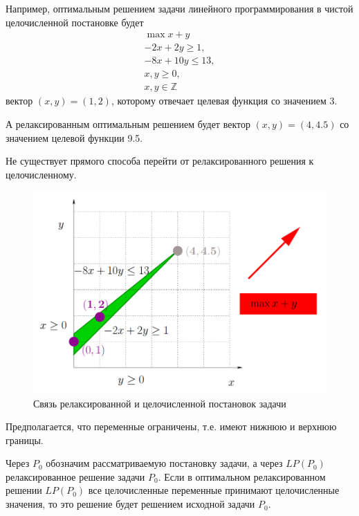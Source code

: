 \documentclass[%
	11pt,
	a4paper,
	utf8,
		]{article}
\begin{document}

Например, оптимальным решением задачи линейного программирования в чистой целочисленной постановке будет
\begin{align*}
	\max x + y\\
	-2x + 2 y \geqslant 1,\\
	-8 x + 10 y \leqslant 13,\\
	x,y \geqslant 0,\\
	x,y \in \mathbb{Z}
\end{align*}
вектор $ (x, y) = (1, 2) $, которому отвечает целевая функция со значением 3.

А релаксированным оптимальным решением будет вектор $ (x, y) = (4, 4.5) $ со значением целевой функции 9.5. 

Не существует прямого способа перейти от релаксированного решения к целочисленному.

\begin{figure}[h]
	\centering
	\includegraphics[scale=0.55]{figures/lp_and_mip.png}
	\caption{ Связь релаксированной и целочисленной постановок задачи }\label{fig:lp_and_mip}
\end{figure}

Предполагается, что переменные ограничены, т.е. имеют нижнюю и верхнюю границы.

Через $ P_0 $ обозначим рассматриваемую постановку задачи, а через $ LP(P_0) $ релаксированное решение задачи $ P_0 $. Если в оптимальном релаксированном решении $ LP(P_0) $ все целочисленные переменные принимают целочисленные значения, то это решение будет решением исходной задачи $ P_0 $.
\end{document}
